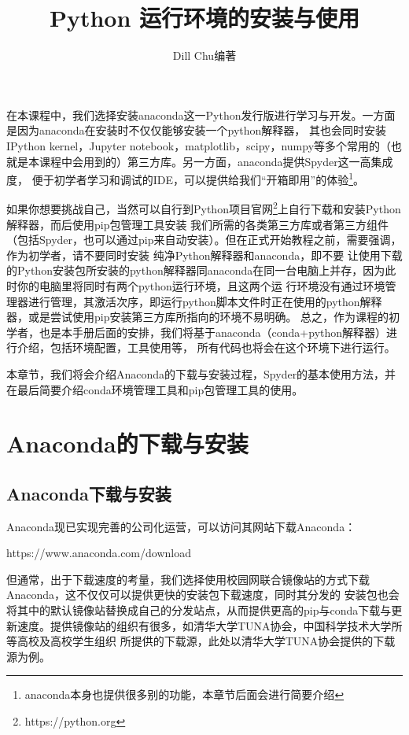 \documentclass[UTF8]{ctexart}
\title{Python 运行环境的安装与使用}
\author{Dill Chu编著}
\begin{document}
\maketitle
\newpage
\lstset{style=bash}
在本课程中，我们选择安装anaconda这一Python发行版进行学习与开发。一方面是因为anaconda在安装时不仅仅能够安装一个python解释器，
其也会同时安装IPython kernel，Jupyter notebook，matplotlib，scipy，numpy等多个常用的（也就是本课程中会用到的）第三方库。另一方面，anaconda提供Spyder这一高集成度，
便于初学者学习和调试的IDE，可以提供给我们“开箱即用”的体验\footnote{anaconda本身也提供很多别的功能，本章节后面会进行简要介绍}。

如果你想要挑战自己，当然可以自行到Python项目官网\footnote{https://python.org}上自行下载和安装Python解释器，而后使用pip包管理工具安装
我们所需的各类第三方库或者第三方组件（包括Spyder，也可以通过pip来自动安装）。但在正式开始教程之前，需要强调，作为初学者，请不要同时安装
纯净Python解释器和anaconda，即不要
让使用下载的Python安装包所安装的python解释器同anaconda在同一台电脑上并存，因为此时你的电脑里将同时有两个python运行环境，且这两个运
行环境没有通过环境管理器进行管理，其激活次序，即运行python脚本文件时正在使用的python解释器，或是尝试使用pip安装第三方库所指向的环境不易明确。
总之，作为课程的初学者，也是本手册后面的安排，我们将基于anaconda（conda+python解释器）进行介绍，包括环境配置，工具使用等，
所有代码也将会在这个环境下进行运行。

本章节，我们将会介绍Anaconda的下载与安装过程，Spyder的基本使用方法，并在最后简要介绍conda环境管理工具和pip包管理工具的使用。
\section{Anaconda的下载与安装}
\subsection{Anaconda下载与安装}
Anaconda现已实现完善的公司化运营，可以访问其网站下载Anaconda：

https://www.anaconda.com/download

但通常，出于下载速度的考量，我们选择使用校园网联合镜像站的方式下载Anaconda，这不仅仅可以提供更快的安装包下载速度，同时其分发的
安装包也会将其中的默认镜像站替换成自己的分发站点，从而提供更高的pip与conda下载与更新速度。提供镜像站的组织有很多，如清华大学TUNA协会，中国科学技术大学所等高校及高校学生组织
所提供的下载源，此处以清华大学TUNA协会提供的下载源为例。
\end{document}
